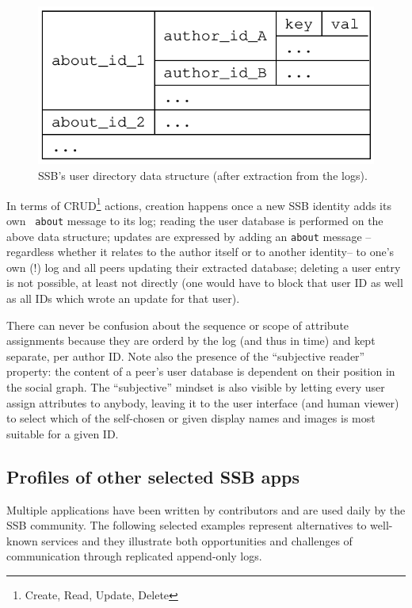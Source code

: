\documentclass[9pt,sigconf]{acmart}
\begin{document}
\begin{figure}[htb]
  \includegraphics[width=0.6\columnwidth]{figs/about-ds.pdf}
  \caption{SSB's user directory data structure (after extraction from
    the logs).}
  \label{fig:about}
\end{figure}

\noindent
In terms of CRUD\footnote{Create, Read, Update, Delete} actions,
creation happens once a new SSB identity adds its own {\small\tt
  about} message to its log; reading the user database is performed on
the above data structure; updates are expressed by adding an
{\small\tt about} message --regardless whether it relates to the
author itself or to another identity-- to one's own (!) log and all
peers updating their extracted database; deleting a user entry is not
possible, at least not directly (one would have to block that user ID
as well as all IDs which wrote an update for that user).

There can never be confusion about the sequence or scope of attribute
assignments because they are orderd by the log (and thus in time) and
kept separate, per author ID. Note also the presence of the
``subjective reader'' property: the content of a peer's user database
is dependent on their position in the social graph. The ``subjective''
mindset is also visible by letting every user assign attributes to
anybody, leaving it to the user interface (and human viewer) to select
which of the self-chosen or given display names and images is most
suitable for a given ID.

\subsection{Profiles of other selected SSB apps}
\label{Section:AppProfiles}

Multiple applications have been written by contributors and are used
daily by the SSB community. The following selected examples represent
alternatives to well-known services and they illustrate both
opportunities and challenges of communication through replicated
append-only logs.
\end{document}
